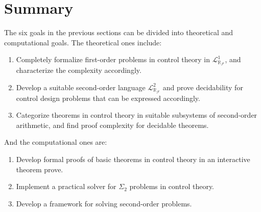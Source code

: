\documentclass[11pt]{article}
\newcommand{\lrf}{\mathcal{L}_{\mathbb{R}_{\mathcal{F}}}}
\theoremstyle{definition}
\begin{document}
\section{Summary}\label{summary}

The six goals in the previous sections can be divided into theoretical and computational goals. The theoretical ones include:
\begin{enumerate}
\item Completely formalize first-order problems in control theory in $\lrf^1$, and characterize the complexity accordingly. 
\item Develop a suitable second-order language $\lrf^2$ and prove decidability for control design problems that can be expressed accordingly. 
\item Categorize theorems in control theory in suitable subsystems of second-order arithmetic, and find proof complexity for decidable theorems. 
\end{enumerate}
And the computational ones are:
\begin{enumerate}
\item Develop formal proofs of basic theorems in control theory in an interactive theorem prove.
\item Implement a practical solver for $\Sigma_2$ problems in control theory. 
\item Develop a framework for solving second-order problems. 
\end{enumerate}


\end{document}
